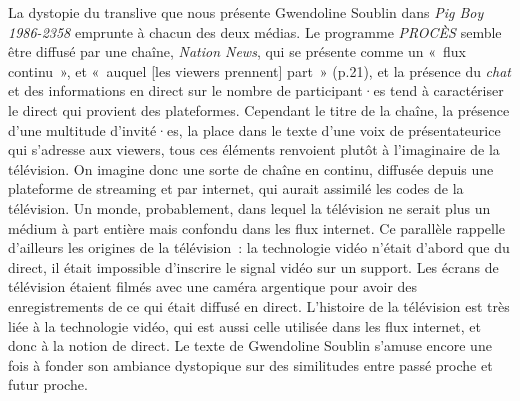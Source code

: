 \documentclass[
]{article}
\begin{document}
La dystopie du translive que nous présente Gwendoline Soublin dans \emph{Pig Boy 1986-2358} emprunte à chacun des deux médias. Le programme \emph{PROCÈS} semble être diffusé par une chaîne, \emph{Nation News}, qui se présente comme un «~flux continu~», et «~auquel {[}les viewers prennent{]} part~» (p.21), et la présence du \emph{chat }et des informations en direct sur le nombre de participant·es tend à caractériser le direct qui provient des plateformes. Cependant le titre de la chaîne, la présence d'une multitude d'invité·es, la place dans le texte d'une voix de présentateurice qui s'adresse aux viewers, tous ces éléments renvoient plutôt à l'imaginaire de la télévision. On imagine donc une sorte de chaîne en continu, diffusée depuis une plateforme de streaming et par internet, qui aurait assimilé les codes de la télévision. Un monde, probablement, dans lequel la télévision ne serait plus un médium à part entière mais confondu dans les flux internet. Ce parallèle rappelle d'ailleurs les origines de la télévision~: la technologie vidéo n'était d'abord que du direct, il était impossible d'inscrire le signal vidéo sur un support. Les écrans de télévision étaient filmés avec une caméra argentique pour avoir des enregistrements de ce qui était diffusé en direct. L'histoire de la télévision est très liée à la technologie vidéo, qui est aussi celle utilisée dans les flux internet, et donc à la notion de direct. Le texte de Gwendoline Soublin s'amuse encore une fois à fonder son ambiance dystopique sur des similitudes entre passé proche et futur proche.
\end{document}
